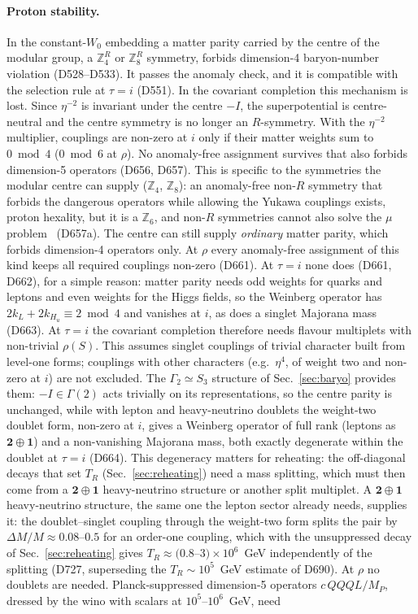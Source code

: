 \documentclass[aps,prd,twocolumn,superscriptaddress,nofootinbib,floatfix]{revtex4-2}
\begin{document}
\paragraph{Proton stability.} In the constant-$W_0$ embedding a matter parity carried by the centre of the modular group, a $\mathbb{Z}_4^R$ or $\mathbb{Z}_8^R$ symmetry, forbids dimension-4 baryon-number violation (D528--D533). It passes the anomaly check, and it is compatible with the selection rule at $\tau = i$ (D551). In the covariant completion this mechanism is lost. Since $\eta^{-2}$ is invariant under the centre $-I$, the superpotential is centre-neutral and the centre symmetry is no longer an $R$-symmetry. With the $\eta^{-2}$ multiplier, couplings are non-zero at $i$ only if their matter weights sum to $0\bmod4$ ($0\bmod6$ at $\rho$). No anomaly-free assignment survives that also forbids dimension-5 operators (D656, D657). This is specific to the symmetries the modular centre can supply ($\mathbb{Z}_4$, $\mathbb{Z}_8$): an anomaly-free non-$R$ symmetry that forbids the dangerous operators while allowing the Yukawa couplings exists, proton hexality, but it is a $\mathbb{Z}_6$, and non-$R$ symmetries cannot also solve the $\mu$ problem~\cite{arXiv_1102_3595} (D657a). The centre can still supply \emph{ordinary} matter parity, which forbids dimension-4 operators only. At $\rho$ every anomaly-free assignment of this kind keeps all required couplings non-zero (D661). At $\tau=i$ none does (D661, D662), for a simple reason: matter parity needs odd weights for quarks and leptons and even weights for the Higgs fields, so the Weinberg operator has $2k_L+2k_{H_u}\equiv2\bmod4$ and vanishes at $i$, as does a singlet Majorana mass (D663). At $\tau=i$ the covariant completion therefore needs flavour multiplets with non-trivial $\rho(S)$. This assumes singlet couplings of trivial character built from level-one forms; couplings with other characters (e.g.\ $\eta^4$, of weight two and non-zero at $i$) are not excluded. The $\Gamma_2\simeq S_3$ structure of Sec.~\ref{sec:baryo} provides them: $-I\in\Gamma(2)$ acts trivially on its representations, so the centre parity is unchanged, while with lepton and heavy-neutrino doublets the weight-two doublet form, non-zero at $i$, gives a Weinberg operator of full rank (leptons as $\mathbf2\oplus\mathbf1$) and a non-vanishing Majorana mass, both exactly degenerate within the doublet at $\tau=i$ (D664). This degeneracy matters for reheating: the off-diagonal decays that set $T_R$ (Sec.~\ref{sec:reheating}) need a mass splitting, which must then come from a $\mathbf2\oplus\mathbf1$ heavy-neutrino structure or another split multiplet. A $\mathbf2\oplus\mathbf1$ heavy-neutrino structure, the same one the lepton sector already needs, supplies it: the doublet--singlet coupling through the weight-two form splits the pair by $\Delta M/M\approx0.08$--$0.5$ for an order-one coupling, which with the unsuppressed decay of Sec.~\ref{sec:reheating} gives $T_R\approx(0.8$--$3)\times10^6$~GeV independently of the splitting (D727, superseding the $T_R\sim10^5$~GeV estimate of D690). At $\rho$ no doublets are needed. Planck-suppressed dimension-5 operators $c\,QQQL/M_P$, dressed by the wino with scalars at $10^5$--$10^6$~GeV, need 
\end{document}
